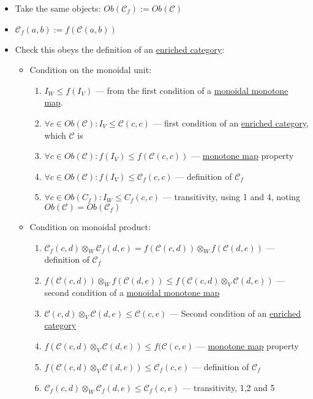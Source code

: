 \begin{itemize}
    \item Take the same objects: $Ob(\mathcal{C}_f):=Ob(\mathcal{C})$
    \item $\mathcal{C}_f(a,b) := f(\mathcal{C}(a,b))$
    \item Check this obeys the definition of an \hyperref[D2.46]{enriched category}:
          \begin{itemize}
            \item Condition on the monoidal unit:
                  \begin{enumerate}
                    \item $I_W \leq f(I_V)$ --- from the first condition of a \hyperref[D2.41]{monoidal monotone map}.
                    \item $\forall c \in Ob(\mathcal{C}): I_V \leq \mathcal{C}(c,c)$ --- first condition of an \hyperref[D2.46]{enriched category}, which $\mathcal{C}$ is
                    \item $\forall c \in Ob(\mathcal{C}):f(I_V) \leq f(\mathcal{C}(c,c))$ --- \hyperref[D1.59]{monotone map} property
                    \item $\forall c \in Ob(\mathcal{C}):f(I_V) \leq \mathcal{C}_f(c,c)$ --- definition of $\mathcal{C}_f$
                    \item $\forall c \in Ob(C_f): I_W \leq C_f(c,c)$ --- transitivity, using 1 and 4, noting $Ob(\mathcal{C})=Ob(\mathcal{C}_f)$
                  \end{enumerate}
            \item Condition on monoidal product:
                  \begin{enumerate}
                    \item $\mathcal{C}_f(c,d) \otimes_W \mathcal{C}_f(d,e) = f(\mathcal{C}(c,d)) \otimes_W f(\mathcal{C}(d,e))$ --- definition of $\mathcal{C}_f$
                    \item $f(\mathcal{C}(c,d)) \otimes_W f(\mathcal{C}(d,e)) \leq f(\mathcal{C}(c,d) \otimes_V \mathcal{C}(d,e))$  --- second condition of a \hyperref[D2.41]{monoidal monotone map}
                    \item $\mathcal{C}(c,d) \otimes_V \mathcal{C}(d,e) \leq \mathcal{C}(c,e)$ --- Second condition of an \hyperref[D2.46]{enriched category}
                    \item $f(\mathcal{C}(c,d) \otimes_V \mathcal{C}(d,e)) \leq f(\mathcal{C}(c,e)$ --- \hyperref[D1.59]{monotone map} property
                    \item $f(\mathcal{C}(c,d) \otimes_V \mathcal{C}(d,e)) \leq \mathcal{C}_f(c,e)$ --- definition of $\mathcal{C}_f$
                    \item $\mathcal{C}_f(c,d) \otimes_W \mathcal{C}_f(d,e) \leq \mathcal{C}_f(c,e)$ --- transitivity, 1,2 and 5
                  \end{enumerate}
          \end{itemize}
  \end{itemize}
